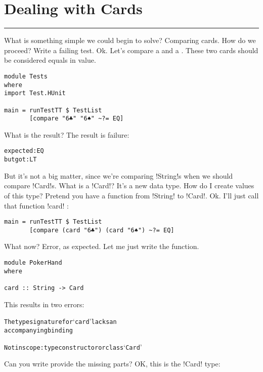 \newpage
\section{Dealing with Cards} 
\vspace{10cm}
\hrule

\lhQ What is something simple we could begin to solve?
\lhA Comparing cards.
\lhN How do we proceed?
\lhA Write a failing test.
\lhN Ok. Let's compare a  and a . These two cards should be considered equals in value.
\begin{lstlisting}[frame=single]
module Tests
where 
import Test.HUnit

main = runTestTT $ TestList 
       [compare "6♣" "6♠" ~?= EQ]
\end{lstlisting} %
What is the result?
\lhA \failure The result is failure: 
\begin{small} 
\begin{alltt}
expected: EQ
 but got: LT
\end{alltt}
\end{small}
But it's not a big matter, since we're comparing \il!String!s when we should compare \il!Card!s.
\lhN What is a \il!Card!?
\lhA It's a new data type.
\lhN How do I create values of this type?
\lhA Pretend you have a function from \il!String! to \il!Card!.
\lhN Ok. I'll just call that function \il!card! :
\begin{lstlisting}[frame=single]
main = runTestTT $ TestList 
       [compare (card "6♣") (card "6♠") ~?= EQ] 
\end{lstlisting} %
What now?
\lhA \error Error, as expected. Let me just write the function.
\begin{lstlisting}[frame=single]
module PokerHand
where

card :: String -> Card
\end{lstlisting}
\lhN \error This results in two errors: 
\begin{small}
\begin{alltt}
The type signature for `card' lacks an 
accompanying binding

Not in scope: type constructor or class `Card'
\end{alltt}
\end{small}
Can you write provide the missing parts?
\lhA \error OK, this is the \il!Card! type:
